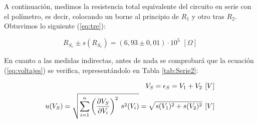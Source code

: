 \documentclass[11pt]{report}
\begin{document}
\begin{refsection}
A continuación, medimos la resistencia total equivalente del circuito en serie con el polímetro, es decir, colocando un borne
al principio de $R_1$ y otro tras $R_2$. Obtuvimos lo siguiente (\ref{eq:tre}):

\begin{equation}
    R_{S_e} \pm s(R_{S_e}) = (6,93 \pm 0,01) \cdot 10^5 \hspace{4pt} [\Omega]
    \label{eq:tre}
\end{equation}

En cuanto a las medidas indirectas, antes de nada se comprobará que la ecuación (\ref{eq:voltajes}) se verifica, representándolo
en Tabla \ref{tab:Serie2}:

\begin{equation}
\begin{split}
    V_S= \epsilon_S = V_1 + V_2 \hspace{4pt} [V] \\
    u(V_S)=\sqrt{\sum^n_{i=1} \left( \frac{\partial V_S}{\partial V_i} \right)^2\hspace{2 pt} s^2(V_i)}=\sqrt{s(V_1)^2+s(V_2)^2}
     \hspace{4pt}[V]
    \label{eq:voltajes}
\end{split}
\end{equation}


\end{refsection}
\end{document}
